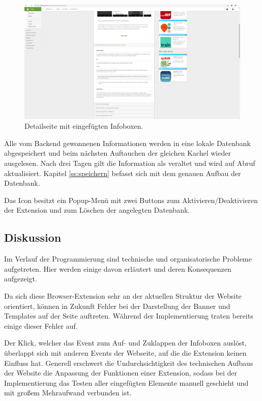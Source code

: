 \begin{figure}[H]
	\centering
	\includegraphics[width=1\textwidth]{pics/ergebnis4.png}
	\caption{Detailseite mit eingefügten Infoboxen.}
	\label{ergebnis4}
\end{figure}

Alle vom Backend gewonnenen Informationen werden in eine lokale Datenbank abgespeichert und beim nächsten Auftauchen der gleichen Kachel wieder ausgelesen. Nach drei Tagen gilt die Information als veraltet und wird auf Abruf aktualisiert. Kapitel \ref{ss:speichern} befasst sich mit dem genauen Aufbau der Datenbank.

Das Icon besitzt ein Popup-Menü mit zwei Buttons zum Aktivieren/Deaktivieren der Extension und zum Löschen der angelegten Datenbank.

\subsection{Diskussion}
\label{ss:diskussionht1}

Im Verlauf der Programmierung sind technische und organisatorische Probleme aufgetreten. Hier werden einige davon erläutert und deren Konsequenzen aufgezeigt.

Da sich diese Browser-Extension sehr an der aktuellen Struktur der Website orientiert, können in Zukunft Fehler bei der Darstellung der Banner und Templates auf der Seite auftreten. Während der Implementierung traten bereits einige dieser Fehler auf.

Der Klick, welcher das Event zum Auf- und Zuklappen der Infoboxen auslöst, überlappt sich mit anderen Events der Webseite, auf die die Extension keinen Einfluss hat. Generell erschwert die Undurchsichtigkeit des technischen Aufbaus der Website die Anpassung der Funktionen einer Extension, sodass bei der Implementierung das Testen aller eingefügten Elemente manuell geschieht und mit großem Mehraufwand verbunden ist.

